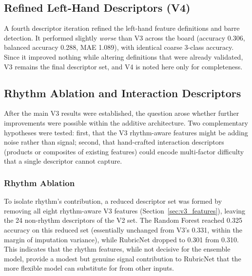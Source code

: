 \subsection{Refined Left-Hand Descriptors (V4)}
A fourth descriptor iteration refined the left-hand feature definitions and barre detection. It performed slightly \emph{worse} than V3 across the board (accuracy 0.306, balanced accuracy 0.288, MAE 1.089), with identical coarse 3-class accuracy. Since it improved nothing while altering definitions that were already validated, V3 remains the final descriptor set, and V4 is noted here only for completeness.

\subsection{Rhythm Ablation and Interaction Descriptors}
\label{sec:interaction_features}
After the main V3 results were established, the question arose whether further improvements were possible within the additive architecture. Two complementary hypotheses were tested: first, that the V3 rhythm-aware features might be adding noise rather than signal; second, that hand-crafted interaction descriptors (products or composites of existing features) could encode multi-factor difficulty that a single descriptor cannot capture.

\subsubsection{Rhythm Ablation}
To isolate rhythm's contribution, a reduced descriptor set was formed by removing all eight rhythm-aware V3 features (Section~\ref{sec:v3_features}), leaving the 24 non-rhythm descriptors of the V2 set. The Random Forest reached 0.325 accuracy on this reduced set (essentially unchanged from V3's 0.331, within the margin of imputation variance), while RubricNet dropped to 0.301 from 0.310. This indicates that the rhythm features, while not decisive for the ensemble model, provide a modest but genuine signal contribution to RubricNet that the more flexible model can substitute for from other inputs.

